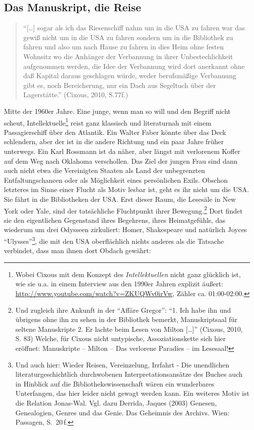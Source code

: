 \documentclass[output=paper]{langscibook}
\begin{document}
\subsection*{Das Manuskript, die Reise}

\begin{quote}
\enquote{{[}\ldots{]} sogar als ich das Riesenschiff nahm um in die USA
zu fahren war das gewiß nicht um in die USA zu fahren sondern um in die
Bibliothek zu fahren und also um nach Hause zu fahren in dies Heim ohne
festen Wohnsitz wo die Anhänger der Verbannung in ihrer
Unbestechlichkeit aufgenommen werden, die Idee der Verbannung wird dort
anerkannt ohne daß Kapital daraus geschlagen würde, weder berufsmäßige
Verbannung gibt es, noch Bereicherung, nur ein Dach aus Segeltuch über
der Lagerstätte.} (Cixous, 2010, S.77f.)
\end{quote}

\noindent Mitte der 1960er Jahre. Eine junge, wenn man so will und den Begriff
nicht scheut, Intellektuelle\footnote{Wobei Cixous mit dem Konzept des
  \emph{Intellektuellen} nicht ganz glücklich ist, wie sie u.a. in einem
  Interview aus den 1990er Jahren explizit äußert:
  \url{http://www.youtube.com/watch?v=ZKUQWv0irVw}, Zähler ca.
  01:00-02:00.} reist ganz klassisch und literaturnah mit einem
Passagierschiff über den Atlantik. Ein Walter Faber könnte über das Deck
schlendern, aber der ist in die andere Richtung und ein paar Jahre
früher unterwegs. Ein Karl Rossmann ist da näher, aber längst mit
verlorenem Koffer auf dem Weg nach Oklahoma verschollen. Das Ziel der
jungen Frau sind dann auch nicht etwa die Vereinigten Staaten als Land
der unbegrenzten Entfaltungschancen oder als Möglichkeit eines
persönlichen Exils. Obschon letzteres im Sinne einer Flucht als Motiv
lesbar ist, geht es ihr nicht um die USA. Sie fährt in die Bibliotheken
der USA. Erst dieser Raum, die Lesesäle in New York oder Yale, sind der
tatsächliche Fluchtpunkt ihrer Bewegung.\footnote{Und zugleich ihre
  Ankunft in der \enquote{Affäre Gregor}: \enquote{1. Ich habe ihn und
  übrigens ohne ihn zu sehen in der Bibliothek bemerkt, Manuskriptsaal
  für seltene Manuskripte 2. Er lachte beim Lesen von Milton
  {[}\ldots{]}} (Cixous, 2010, S. 83) Welche, für Cixous nicht
  untypische, Assoziationskette sich hier eröffnet: Manuskripte --
  Milton -- Das verlorene Paradies -- im Lesesaal!} Dort findet sie den
eigentlichen Gegenstand ihres Begehrens, ihres Heimatgefühls, das
wiederum um drei Odysseen zirkuliert: Homer, Shakespeare und natürlich
Joyces \enquote{Ulysses}\footnote{Und auch hier: Wieder Reisen,
  Vereinzelung, Irrfahrt - Die unendlichen literaturgeschichtlich
  durchwobenen Interpretationsansätze des Buches auch in Hinblick auf
  die Bibliothekswissenschaft wären ein wunderbares Unterfangen, das
  hier leider nicht gewagt werden kann. Ein weiteres Motiv ist die
  Relation Jonas-Wal. Vgl. dazu Derrida, Jaques (2003) Genesen,
  Genealogien, Genres und das Genie. Das Geheimnis des Archivs. Wien:
  Passagen, S.~20\,f.}, die mit den USA oberflächlich nichts anderes als
die Tatsache verbindet, dass man ihnen dort Obdach gewährt:
\end{document}
